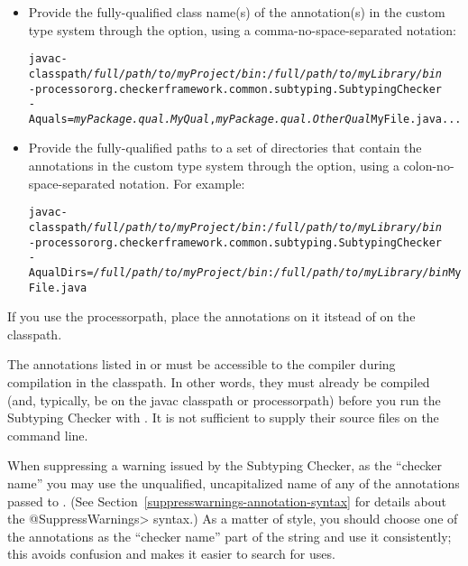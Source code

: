 \begin{itemize}

\item
Provide the fully-qualified class name(s) of the annotation(s) in the custom
type system through the  option, using a comma-no-space-separated
notation:

\begin{alltt}
  javac -classpath \textit{/full/path/to/myProject/bin}:\textit{/full/path/to/myLibrary/bin} \ttbs
        -processor org.checkerframework.common.subtyping.SubtypingChecker \ttbs
        -Aquals=\textit{myPackage.qual.MyQual},\textit{myPackage.qual.OtherQual} MyFile.java ...
\end{alltt}

\item
Provide the fully-qualified paths to a set of directories that contain the
annotations in the custom type system through the  option,
using a colon-no-space-separated notation. For example:

\begin{alltt}
  javac -classpath \textit{/full/path/to/myProject/bin}:\textit{/full/path/to/myLibrary/bin} \ttbs
        -processor org.checkerframework.common.subtyping.SubtypingChecker \ttbs
        -AqualDirs=\textit{/full/path/to/myProject/bin}:\textit{/full/path/to/myLibrary/bin} MyFile.java
\end{alltt}

\end{itemize}

If you use the processorpath, place the annotations on it itstead of on the
classpath.



The annotations listed in  or  must be accessible to
the compiler during compilation in the classpath.  In other words, they must
already be compiled (and, typically, be on the javac classpath or processorpath)
before you run the Subtyping Checker with .  It
is not sufficient to supply their source files on the command line.



When suppressing a warning issued by the Subtyping Checker, as the
``checker name'' you may use the unqualified, uncapitalized name of any of
the annotations passed to .  (See
Section~\ref{suppresswarnings-annotation-syntax} for details about the
\<@SuppressWarnings> syntax.)  As a matter of style, you should
choose one of the annotations as the ``checker name'' part of the
 string and use it consistently; this avoids
confusion and makes it easier to search for uses.


